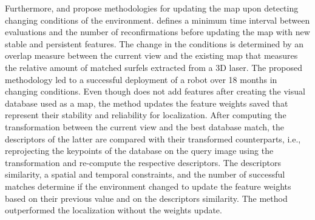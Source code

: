 Furthermore, \cite{egger-et-al:2018:8593854} and \cite{derner-et-al:2021:103676} propose methodologies for updating the map upon detecting changing conditions of the environment.
\cite{egger-et-al:2018:8593854} defines a minimum time interval between evaluations and the number of reconfirmations before updating the map with new stable and persistent features. The change in the conditions is determined by an overlap measure between the current view and the existing map that measures the relative amount of matched surfels extracted from a 3D laser. The proposed methodology led to a successful deployment of a robot over 18 months in changing conditions.
Even though \cite{derner-et-al:2021:103676} does not add features after creating the visual database used as a map, the method updates the feature weights saved that represent their stability and reliability for localization. After computing the transformation between the current view and the best database match, the descriptors of the latter are compared with their transformed counterparts, i.e., reprojecting the keypoints of the database on the query image using the transformation and re-compute the respective descriptors. The descriptors similarity, a spatial and temporal constraints, and the number of successful matches determine if the environment changed to update the feature weights based on their previous value and on the descriptors similarity. The method outperformed the localization without the weights update.

